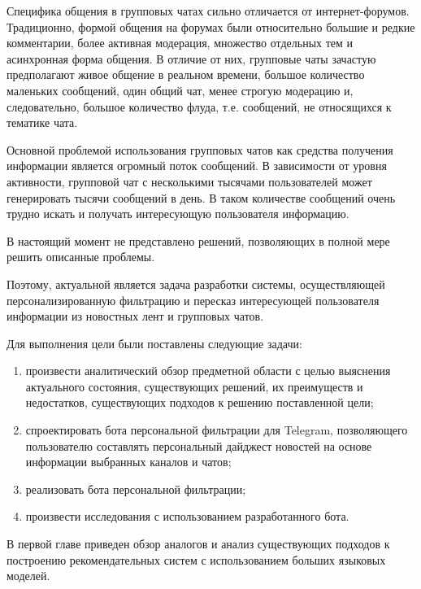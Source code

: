 Специфика общения в групповых чатах сильно отличается от интернет-форумов. Традиционно, формой общения на форумах были относительно большие и редкие комментарии, более активная модерация, множество отдельных тем и асинхронная форма общения. В отличие от них, групповые чаты зачастую предполагают живое общение в реальном времени, большое количество маленьких сообщений, один общий чат, менее строгую модерацию и, следовательно, большое количество флуда, т.е. сообщений, не относящихся к тематике чата.

Основной проблемой использования групповых чатов как средства получения информации является огромный поток сообщений. В зависимости от уровня активности, групповой чат с несколькими тысячами пользователей может генерировать тысячи сообщений в день. В таком количестве сообщений очень трудно искать и получать интересующую пользователя информацию.

В настоящий момент не представлено решений, позволяющих в полной мере решить описанные проблемы.

Поэтому, актуальной является задача разработки системы, осуществляющей персонализированную фильтрацию и пересказ интересующей пользователя информации из новостных лент и групповых чатов.

Для выполнения цели были поставлены следующие задачи:
\begin{enumerate}
    \item произвести аналитический обзор предметной области с целью выяснения актуального состояния, существующих решений, их преимуществ и недостатков, существующих подходов к решению поставленной цели;
    \item спроектировать бота персональной фильтрации для Telegram, позволяющего пользователю составлять персональный дайджест новостей на основе информации выбранных каналов и чатов;
    \item реализовать бота персональной фильтрации;
    \item произвести исследования с использованием разработанного бота.
\end{enumerate}

В первой главе приведен обзор аналогов и анализ существующих подходов к построению рекомендательных систем с использованием больших языковых моделей.
